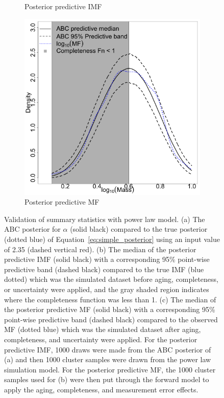 \documentclass[12pt]{article}
\begin{document}
\begin{figure}[htbp]
\begin{subfigure}{0.32\textwidth}
\caption{Posterior predictive IMF}\label{subfig:basic_imf}
\end{subfigure}
\begin{subfigure}{0.32\textwidth}
\centering
\includegraphics[width=\textwidth]{figures/basic_1_1000_predictive_mf.png}
\caption{Posterior predictive MF}\label{subfig:basic_mf}
\end{subfigure}        
   \caption{Validation of summary statistics with power law model.  (a) The ABC posterior for $\alpha$ (solid black) compared to the true posterior (dotted blue) of Equation~\eqref{eq:simple_posterior} using an input value of 2.35 (dashed vertical red).  (b) The median of the posterior predictive IMF (solid black) with a corresponding 95\% point-wise predictive band (dashed black) compared to the true IMF (blue dotted) which was the simulated dataset before aging, completeness, or uncertainty were applied, and the gray shaded region indicates where the completeness function was less than 1.  (c) The median of the posterior predictive MF (solid black) with a corresponding 95\% point-wise predictive band (dashed black) compared to the observed MF (dotted blue) which was the simulated dataset after aging, completeness, and uncertainty were applied.  For the posterior predictive IMF, 1000 draws were made from the ABC posterior of (a) and then 1000 cluster samples were drawn from the power law simulation model.  For the posterior predictive MF, the 1000 cluster samples used for (b) were then put through the forward model to apply the aging, completeness, and measurement error effects.
} \label{fig:abc_simple}
\end{figure}
\end{document}

